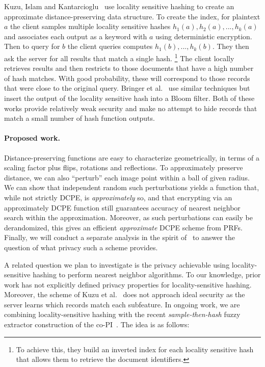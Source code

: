 Kuzu, Islam and Kantarcioglu~\cite{kuzu2012efficient} use locality sensitive hashing to create an approximate distance-preserving data structure.  To create the index, for plaintext $a$ the client samples multiple locality sensitive hashes $h_1(a), h_2(a),...,h_k(a)$ and associates each output as a keyword with $a$ using deterministic encryption.
Then to query for $b$ the client queries computes $h_1(b),...,h_k(b)$. They then ask the server for all results that match
a single hash.%
\footnote{To achieve this, they build an inverted index for each
locality sensitive hash that allows them to retrieve the document
identifiers.}  The client locally retrieves results and then restricts
to those documents that have a high number of hash matches.  With good
probability, these will correspond to those records that were close to
the original query.  Bringer et
al.~\cite{bringer2011identification,bringer2009error} use similar
techniques but insert the output of the locality sensitive hash into a
Bloom filter.  Both of these works provide relatively weak security and
make no attempt to hide records that match a small number of hash
function outputs.  

\paragraph{Proposed work.}
Distance-preserving functions are easy to characterize geometrically, in terms of a scaling factor plus flips, rotations and reflections.  To approximately preserve distance, we can also  ``perturb'' each image point within a ball of given radius.  
We can show that independent random such perturbations yields a function that, while not strictly DCPE, is \emph{approximately} so, and that encrypting via an approximately DCPE function still guarantees accuracy of nearest neighbor  search within the approximation.  Moreover, as such perturbations can easily be derandomized, this gives an efficient \emph{approximate} DCPE scheme from PRFs.  Finally, we will conduct a separate analysis in the spirit of~\cite{C:BolCheONe11} to answer the question of what privacy such a scheme provides.  

 A related question we plan to investigate is the privacy achievable using locality-sensitive hashing to perform nearest neighbor algorithms.  To our knowledge, prior work has not explicitly defined privacy properties for locality-sensitive hashing.  Moreover, the scheme of Kuzu et al.~\cite{kuzu2012efficient}  does not approach ideal security as the server learns which records match each subfeature.  In ongoing work, we are combining locality-sensitive hashing with the recent \emph{sample-then-hash} fuzzy extractor construction of the co-PI~\cite{EC:CFPRS16}.  The idea is as follows:


